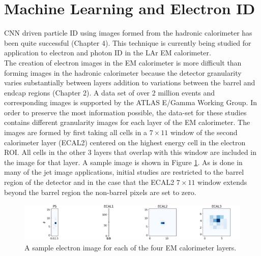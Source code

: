 \section{Machine Learning and Electron ID\label{ml_id}}
CNN driven particle ID using images formed from the hadronic calorimeter has been quite successful (Chapter 4). This technique is currently being studied for application to electron and photon ID in the LAr EM calorimeter.\\

The creation of electron images in the EM calorimeter is more difficult than forming images in the hadronic calorimeter because the detector granularity varies substantially between layers addition to variations between the barrel and endcap regions (Chapter 2). A data set of over 2 million events and corresponding images is supported by the ATLAS E/Gamma Working Group. In order to preserve the most information possible, the data-set for these studies contains different granularity images for each layer of the EM calorimeter. The images are formed by first taking all cells in a $7\times 11$ window of the second calorimeter layer (ECAL2) centered on the highest energy cell in the electron ROI. All cells in the other 3 layers that overlap with this window are included in the image for that layer. A sample image is shown in Figure \ref{fig:elec_imgs}. As is done in many of the jet image applications, initial studies are restricted to the barrel region of the detector and in the case that the ECAL2 $7\times11$ window extends beyond the barrel region the non-barrel pixels are set to zero.\\

\begin{figure}[htb!]
    \centering
    \includegraphics[width=6in]{figures/chapter5/regular_electron_imgs.png}
    \caption{A sample electron image for each of the four EM calorimeter layers.}
    \label{fig:elec_imgs}
\end{figure}

